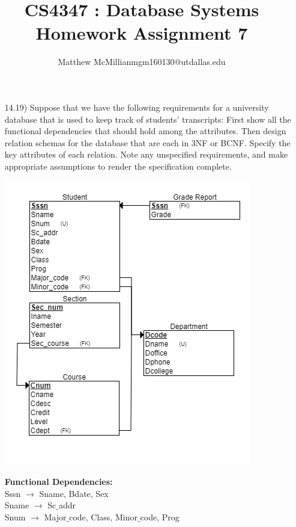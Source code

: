 \documentclass[12pt]{article}
\begin{document}
\title{CS4347 : Database Systems\\Homework Assignment 7}
\author{Matthew McMillianmgm160130@utdallas.edu}
\maketitle



\begin{enumerate}

	\item[14.19)] Suppose that we have the following requirements for a university database that is used to keep track of students’ transcripts: First show all the functional dependencies
that should hold among the attributes. Then design relation schemas for the database that are each in 3NF or BCNF. Specify the key attributes of each relation. Note any unspecified requirements, and make appropriate assumptions to render the specification complete.
	\begin{center}
			\includegraphics[scale=1]{hw7r1}
	\end{center} 
		\textbf{Functional Dependencies:} \\
		Sssn $\rightarrow$ Sname, Bdate, Sex\\
		Sname $\rightarrow$ Sc$\_$addr\\
		Snum $\rightarrow$ Major$\_$code, Class, Minor$\_$code, Prog\\

\end{enumerate}
\end{document}

